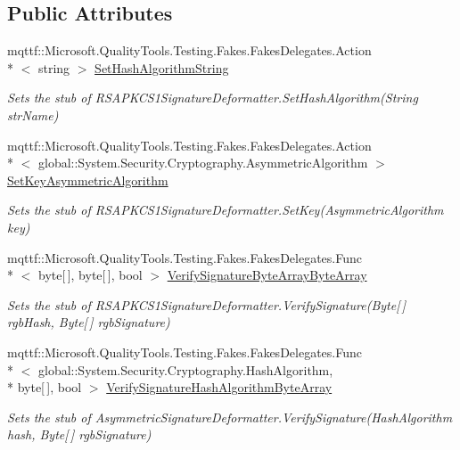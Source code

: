 \subsection*{Public Attributes}
\begin{DoxyCompactItemize}
\item 
mqttf\-::\-Microsoft.\-Quality\-Tools.\-Testing.\-Fakes.\-Fakes\-Delegates.\-Action\\*
$<$ string $>$ \hyperlink{class_system_1_1_security_1_1_cryptography_1_1_fakes_1_1_stub_r_s_a_p_k_c_s1_signature_deformatter_ae90f4a43bc3f7d4a3415aaeb90e1023f}{Set\-Hash\-Algorithm\-String}
\begin{DoxyCompactList}\small\item\em Sets the stub of R\-S\-A\-P\-K\-C\-S1\-Signature\-Deformatter.\-Set\-Hash\-Algorithm(\-String str\-Name)\end{DoxyCompactList}\item 
mqttf\-::\-Microsoft.\-Quality\-Tools.\-Testing.\-Fakes.\-Fakes\-Delegates.\-Action\\*
$<$ global\-::\-System.\-Security.\-Cryptography.\-Asymmetric\-Algorithm $>$ \hyperlink{class_system_1_1_security_1_1_cryptography_1_1_fakes_1_1_stub_r_s_a_p_k_c_s1_signature_deformatter_aab350e2129afd7b8744a973e00a29fac}{Set\-Key\-Asymmetric\-Algorithm}
\begin{DoxyCompactList}\small\item\em Sets the stub of R\-S\-A\-P\-K\-C\-S1\-Signature\-Deformatter.\-Set\-Key(\-Asymmetric\-Algorithm key)\end{DoxyCompactList}\item 
mqttf\-::\-Microsoft.\-Quality\-Tools.\-Testing.\-Fakes.\-Fakes\-Delegates.\-Func\\*
$<$ byte\mbox{[}$\,$\mbox{]}, byte\mbox{[}$\,$\mbox{]}, bool $>$ \hyperlink{class_system_1_1_security_1_1_cryptography_1_1_fakes_1_1_stub_r_s_a_p_k_c_s1_signature_deformatter_a86a3975cb2f3925e59f1261f25743e9b}{Verify\-Signature\-Byte\-Array\-Byte\-Array}
\begin{DoxyCompactList}\small\item\em Sets the stub of R\-S\-A\-P\-K\-C\-S1\-Signature\-Deformatter.\-Verify\-Signature(\-Byte\mbox{[}$\,$\mbox{]} rgb\-Hash, Byte\mbox{[}$\,$\mbox{]} rgb\-Signature)\end{DoxyCompactList}\item 
mqttf\-::\-Microsoft.\-Quality\-Tools.\-Testing.\-Fakes.\-Fakes\-Delegates.\-Func\\*
$<$ global\-::\-System.\-Security.\-Cryptography.\-Hash\-Algorithm, \\*
byte\mbox{[}$\,$\mbox{]}, bool $>$ \hyperlink{class_system_1_1_security_1_1_cryptography_1_1_fakes_1_1_stub_r_s_a_p_k_c_s1_signature_deformatter_a0e2831457b5c362a2102aae6679ce7e7}{Verify\-Signature\-Hash\-Algorithm\-Byte\-Array}
\begin{DoxyCompactList}\small\item\em Sets the stub of Asymmetric\-Signature\-Deformatter.\-Verify\-Signature(\-Hash\-Algorithm hash, Byte\mbox{[}$\,$\mbox{]} rgb\-Signature)\end{DoxyCompactList}\end{DoxyCompactItemize}
